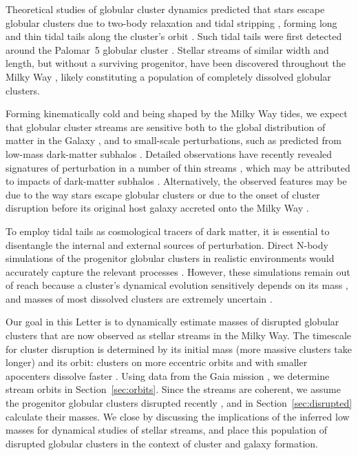 \documentclass[twocolumn]{aastex63}
\begin{document}
Theoretical studies of globular cluster dynamics predicted that stars escape globular clusters due to two-body relaxation and tidal stripping \citep[e.g.,][]{spitzer:1987, baumgardt03}, forming long and thin tidal tails along the cluster's orbit \citep{combes:1999}.
Such tidal tails were first detected around the Palomar~5 globular cluster \citep{odenkirchen:2001, rockosi:2002}.
Stellar streams of similar width and length, but without a surviving progenitor, have been discovered throughout the Milky Way \citep[e.g.,][]{gd:2006, grillmair:2009, bonaca:2012, shipp:2018, ibata:2019}, likely constituting a population of completely dissolved globular clusters.

Forming kinematically cold and being shaped by the Milky Way tides, we expect that globular cluster streams are sensitive both to the global distribution of matter in the Galaxy \citep[e.g.,][]{lux:2013, bonaca:2014, sanders:2014}, and to small-scale perturbations, such as predicted from low-mass dark-matter subhalos \citep[e.g.,][]{ibata:2002, yoon:2011, erkal:2016}.
Detailed observations have recently revealed signatures of perturbation in a number of thin streams \citep[e.g.,][]{pwb, bonaca:2019a, bonaca:2020, li:2020}, which may be attributed to impacts of dark-matter subhalos \citep[e.g.,][]{bonaca:2019b, banik:2019}.
Alternatively, the observed features may be due to the way stars escape globular clusters \citep[e.g.,][]{kuepper:2008, kuepper:2010} or due to the onset of cluster disruption before its original host galaxy accreted onto the Milky Way \citep[e.g.,][]{carlberg:2018, malhan:2020}.

To employ tidal tails as cosmological tracers of dark matter, it is essential to disentangle the internal and external sources of perturbation.
Direct N-body simulations of the progenitor globular clusters in realistic environments would accurately capture the relevant processes \citep[e.g.,][]{renaud:2015}.
However, these simulations remain out of reach because a cluster's dynamical evolution sensitively depends on its mass \citep[e.g.,][]{hh:2003, balbinot:2018}, and masses of most dissolved clusters are extremely uncertain \citep[e.g.,][]{erkal:2016b}.

Our goal in this Letter is to dynamically estimate masses of disrupted globular clusters that are now observed as stellar streams in the Milky Way.
The timescale for cluster disruption is determined by its initial mass (more massive clusters take longer) and its orbit: clusters on more eccentric orbits and with smaller apocenters dissolve faster \citep{kruijssen09}.
Using data from the Gaia mission \citep{gdr2}, we determine stream orbits in Section~\ref{sec:orbits}.
Since the streams are coherent, we assume the progenitor globular clusters disrupted recently \citep{helmi:2003}, and in Section~\ref{sec:disrupted} calculate their masses.
We close by discussing the implications of the inferred low masses for dynamical studies of stellar streams, and place this population of disrupted globular clusters in the context of cluster and galaxy formation.
\end{document}
